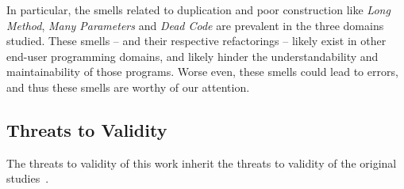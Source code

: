 \documentclass{sig-alternate}
\newcommand{\todo}[1]{\textbf{TODO: #1}}
\begin{document}
In particular, the smells related to duplication and poor construction like \emph{Long Method}, \emph{Many Parameters} and \emph{Dead Code} are prevalent in the three domains studied.
These smells -- and their respective refactorings -- likely exist in other end-user programming domains, and likely hinder the understandability and maintainability of those programs.
Worse even, these smells could lead to errors, and thus these smells are worthy of our attention. 




\subsection{Threats to Validity}
The threats to validity of this work inherit the threats to validity of the original studies~\cite{Stolee2015, Stolee2011, StoleeTSE2013, Hermans2011, Hermans2012intra, Hermans2012inter, hermans2014bumblebee, chambers2013smell, chambers2015impact, badame2012refactoring}.
\end{document}

